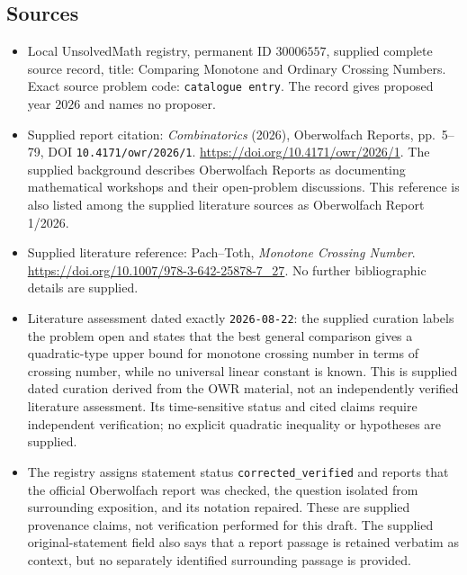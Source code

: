 \documentclass[11pt]{article}
\begin{document}
\subsection{Sources}
\begin{itemize}
\item Local UnsolvedMath registry, permanent ID \(30006557\), supplied complete source record, title: Comparing Monotone and Ordinary Crossing Numbers. Exact source problem code: \texttt{catalogue entry}. The record gives proposed year \(2026\) and names no proposer.
\item Supplied report citation: \emph{Combinatorics} (2026), Oberwolfach Reports, pp.\ 5--79, DOI \texttt{10.4171/owr/2026/1}. \url{https://doi.org/10.4171/owr/2026/1}. The supplied background describes Oberwolfach Reports as documenting mathematical workshops and their open-problem discussions. This reference is also listed among the supplied literature sources as Oberwolfach Report 1/2026.
\item Supplied literature reference: Pach--Toth, \emph{Monotone Crossing Number}. \url{https://doi.org/10.1007/978-3-642-25878-7_27}. No further bibliographic details are supplied.
\item Literature assessment dated exactly \texttt{2026-08-22}: the supplied curation labels the problem open and states that the best general comparison gives a quadratic-type upper bound for monotone crossing number in terms of crossing number, while no universal linear constant is known. This is supplied dated curation derived from the OWR material, not an independently verified literature assessment. Its time-sensitive status and cited claims require independent verification; no explicit quadratic inequality or hypotheses are supplied.
\item The registry assigns statement status \texttt{corrected\_verified} and reports that the official Oberwolfach report was checked, the question isolated from surrounding exposition, and its notation repaired. These are supplied provenance claims, not verification performed for this draft. The supplied original-statement field also says that a report passage is retained verbatim as context, but no separately identified surrounding passage is provided.
\end{itemize}
\end{document}
